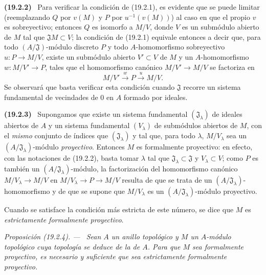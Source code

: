 \documentclass[10pt,oneside]{book}
\makeatletter
\newcommand{\setmanualcurrentlabel}[1]{\def\@currentlabel{#1}}
\newcommand{\oldpage}[2][]{%
  \setcounter{footnote}{0}%
  \marginpar{\scriptsize\textbf{#1}~|~#2}\ignorespaces}
\newenvironment{env}[1][]{\setmanualcurrentlabel{#1}\par\medskip\noindent\textbf{(#1)}\ }{\par}
\newenvironment{proposition}[1][]{%
  \setmanualcurrentlabel{#1}\par\medskip\noindent\itshape Proposición (#1). ---\ }{\par}
\makeatother
\begin{document}
\begin{env}[19.2.2]
\label{0.19.2.2-es}
Para verificar la condición de (19.2.1), es evidente que se puede limitar
(reemplazando $Q$ por $v(M)$ y $P$ por $u^{-1}(v(M))$) al caso en que el propio
$v$ es sobreyectivo; entonces $Q$ es isomorfo a $M/V$, donde $V$ es un
submódulo abierto de $M$ tal que $\mathfrak JM\subset V$; la condición de
(19.2.1) equivale entonces a decir que, para todo $(A/\mathfrak J)$-módulo discreto
$P$ y todo $A$-homomorfismo sobreyectivo $u:P\to M/V$, existe un submódulo
abierto $V'\subset V$ de $M$ y un $A$-homomorfismo $w:M/V'\to P$, tales que
el homomorfismo canónico $M/V'\to M/V$ se factoriza en
\[
  M/V'\xrightarrow{w}P\xrightarrow{u}M/V.
\]
Se observará que basta verificar esta condición cuando $\mathfrak J$
recorre un sistema fundamental de vecindades de 0 en $A$ formado por ideales.
\end{env}

\begin{env}[19.2.3]
\label{0.19.2.3-es}
Supongamos que existe un sistema fundamental $(\mathfrak J_\lambda)$ de ideales
abiertos de $A$ y un sistema fundamental $(V_\lambda)$ de submódulos
abiertos de $M$, con el \emph{mismo} conjunto de índices que
$(\mathfrak J_\lambda)$ y tal que, para todo $\lambda$, $M/V_\lambda$ sea un
$(A/\mathfrak J_\lambda)$-módulo \emph{proyectivo}. Entonces $M$ es formalmente
proyectivo: en efecto, con las notaciones de (19.2.2), basta tomar
$\lambda$ tal que $\mathfrak J_\lambda\subset\mathfrak J$ y
$V_\lambda\subset V$; como $P$ es también un
$(A/\mathfrak J_\lambda)$-módulo, la factorización del homomorfismo canónico
$M/V_\lambda\to M/V$ en $M/V_\lambda\to P\to M/V$ resulta de que se trata
de un $(A/\mathfrak J_\lambda)$-homomorfismo y de que se supone que
$M/V_\lambda$ es un $(A/\mathfrak J_\lambda)$-módulo proyectivo.

Cuando se satisface la condición más estricta de este número, se dice que $M$
es \emph{estrictamente formalmente proyectivo}.
\end{env}

\begin{proposition}[19.2.4]
\label{0.19.2.4-es}
Sean $A$ un anillo topológico y $M$ un $A$-módulo topológico cuya
topología se deduce de la de $A$. Para que $M$ sea formalmente
proyectivo, es necesario y suficiente que sea estrictamente formalmente proyectivo.
\end{proposition}

\oldpage[0\textsubscript{IV-1}]{79}
\end{document}
